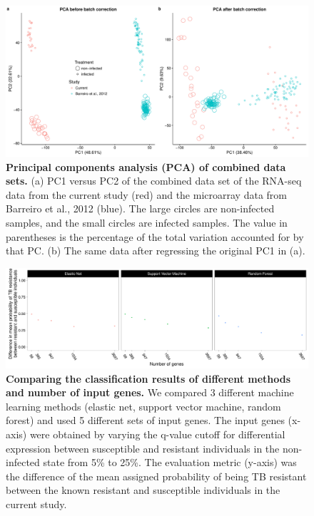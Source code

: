\begin{figure}[!htb]
\centering \includegraphics[width=5in]{img/ch03/combined-pca.pdf}
\caption[Principal components analysis (PCA) of combined data sets.]{
  \textbf{Principal components analysis (PCA) of combined data sets.}
  (a) PC1 versus PC2 of the combined data set of the RNA-seq data from
  the current study (red) and the microarray data from Barreiro et
  al., 2012 \citep{Barreiro2012} (blue). The large circles are
  non-infected samples, and the small circles are infected
  samples. The value in parentheses is the percentage of the total
  variation accounted for by that PC. (b) The same data after
  regressing the original PC1 in (a).  }
\label{fig:combined-pca}
\end{figure}

\begin{figure}[!htb]
\centering
\includegraphics[width=5in]{img/ch03/classifier-compare.pdf}
\caption[Comparing the classification results of different methods and
  number of input genes.]{ \textbf{Comparing the classification
    results of different methods and number of input genes.} We
  compared 3 different machine learning methods (elastic net, support
  vector machine, random forest) and used 5 different sets of input
  genes. The input genes (x-axis) were obtained by varying the q-value
  cutoff for differential expression between susceptible and resistant
  individuals in the non-infected state from 5\% to 25\%. The
  evaluation metric (y-axis) was the difference of the mean assigned
  probability of being TB resistant between the known resistant and
  susceptible individuals in the current study.  }
\label{fig:class-compare}
\end{figure}

